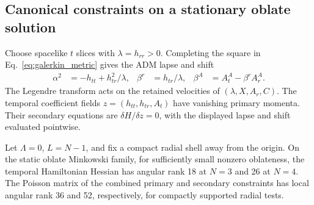 \subsection{Canonical constraints on a stationary oblate solution}

Choose spacelike $t$ slices with $\lambda=h_{rr}>0$. Completing the square in Eq.~\eqref{eq:galerkin_metric} gives the ADM lapse and shift
\begin{align}
\alpha^2&=-h_{tt}+h_{tr}^2/\lambda, &
\beta^r&=h_{tr}/\lambda, &
\beta^A&=A_t^A-\beta^r A_r^A .
\end{align}
The Legendre transform acts on the retained velocities of $(\lambda,X,A_r,C)$. The temporal coefficient fields $z=(h_{tt},h_{tr},A_t)$ have vanishing primary momenta. Their secondary equations are $\delta H/\delta z=0$, with the displayed lapse and shift evaluated pointwise.

\begin{proposition}\label{prop:oblate_rank}
Let $\Lambda=0$, $L=N-1$, and fix a compact radial shell away from the origin. On the static oblate Minkowski family, for sufficiently small nonzero oblateness, the temporal Hamiltonian Hessian has angular rank 18 at $N=3$ and 26 at $N=4$. The Poisson matrix of the combined primary and secondary constraints has local angular rank 36 and 52, respectively, for compactly supported radial tests.
\end{proposition}

